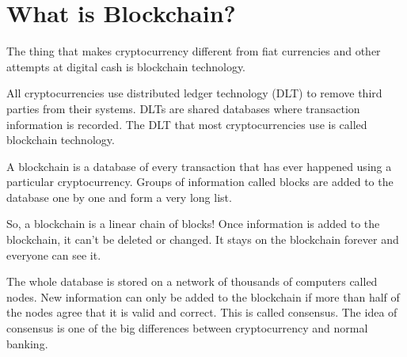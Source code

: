\documentclass[9pt,twocolumn,twoside]{optica-suppl-materials}
\begin{document}
\section{What is Blockchain?}
\begin{condenseditemize}
    

    \item 
The thing that makes cryptocurrency different from fiat
currencies and other attempts at digital cash is blockchain
technology.
\item All cryptocurrencies use distributed ledger technology (DLT)
to remove third parties from their systems. DLTs are shared
databases where transaction information is recorded. The DLT
that most cryptocurrencies use is called blockchain technology.
\item A blockchain is a database of every transaction that has ever
happened using a particular cryptocurrency. Groups of
information called blocks are added to the database one by
one and form a very long list.
\item So, a blockchain is a linear chain of blocks! Once information
is added to the blockchain, it can’t be deleted or changed. It
stays on the blockchain forever and everyone can see it.
\item The whole database is stored on a network of thousands of
computers called nodes. New information can only be added
to the blockchain if more than half of the nodes agree that it
is valid and correct. This is called consensus. The idea of
consensus is one of the big differences between cryptocurrency
and normal banking.

\end{condenseditemize}
\end{document}
